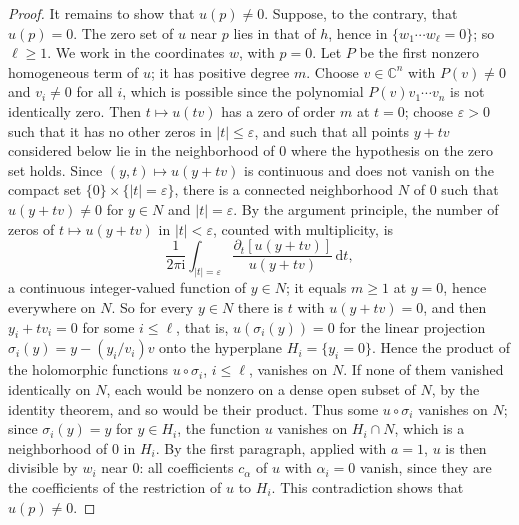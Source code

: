 \begin{proof}
It remains to show that $u(p)\neq0$. Suppose, to the contrary, that $u(p)=0$. The zero set of $u$ near $p$ lies in that of $h$, hence in $\{w_1\cdots w_\ell=0\}$; so $\ell\geq1$. We work in the coordinates $w$, with $p=0$. Let $P$ be the first nonzero homogeneous term of $u$; it has positive degree $m$. Choose $v\in\mathbb C^n$ with $P(v)\neq0$ and $v_i\neq0$ for all $i$, which is possible since the polynomial $P(v)v_1\cdots v_n$ is not identically zero. Then $t\mapsto u(tv)$ has a zero of order $m$ at $t=0$; choose $\varepsilon>0$ such that it has no other zeros in $|t|\leq\varepsilon$, and such that all points $y+tv$ considered below lie in the neighborhood of $0$ where the hypothesis on the zero set holds. Since $(y,t)\mapsto u(y+tv)$ is continuous and does not vanish on the compact set $\{0\}\times\{|t|=\varepsilon\}$, there is a connected neighborhood $N$ of $0$ such that $u(y+tv)\neq0$ for $y\in N$ and $|t|=\varepsilon$. By the argument principle, the number of zeros of $t\mapsto u(y+tv)$ in $|t|<\varepsilon$, counted with multiplicity, is
\[
 \frac1{2\pi\mathrm i}\int_{|t|=\varepsilon}\frac{\partial_t[u(y+tv)]}{u(y+tv)}\,\mathrm dt,
\]
a continuous integer-valued function of $y\in N$; it equals $m\geq1$ at $y=0$, hence everywhere on $N$. So for every $y\in N$ there is $t$ with $u(y+tv)=0$, and then $y_i+tv_i=0$ for some $i\leq\ell$, that is, $u(\sigma_i(y))=0$ for the linear projection $\sigma_i(y)=y-(y_i/v_i)v$ onto the hyperplane $H_i=\{y_i=0\}$. Hence the product of the holomorphic functions $u\circ\sigma_i$, $i\leq\ell$, vanishes on $N$. If none of them vanished identically on $N$, each would be nonzero on a dense open subset of $N$, by the identity theorem, and so would be their product. Thus some $u\circ\sigma_i$ vanishes on $N$; since $\sigma_i(y)=y$ for $y\in H_i$, the function $u$ vanishes on $H_i\cap N$, which is a neighborhood of $0$ in $H_i$. By the first paragraph, applied with $a=1$, $u$ is then divisible by $w_i$ near $0$: all coefficients $c_\alpha$ of $u$ with $\alpha_i=0$ vanish, since they are the coefficients of the restriction of $u$ to $H_i$. This contradiction shows that $u(p)\neq0$.
\end{proof}

